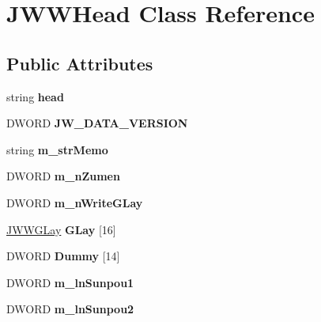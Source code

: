 \hypertarget{classJWWHead}{\section{J\-W\-W\-Head Class Reference}
\label{classJWWHead}
}
\subsection*{Public Attributes}
\begin{DoxyCompactItemize}
\item 
\hypertarget{classJWWHead_a42ddd0bada26e01f5b570d88e48697e4}{string {\bfseries head}}\label{classJWWHead_a42ddd0bada26e01f5b570d88e48697e4}

\item 
\hypertarget{classJWWHead_acd75c404ff5f2b93a2b0828c1072fbe4}{D\-W\-O\-R\-D {\bfseries J\-W\-\_\-\-D\-A\-T\-A\-\_\-\-V\-E\-R\-S\-I\-O\-N}}\label{classJWWHead_acd75c404ff5f2b93a2b0828c1072fbe4}

\item 
\hypertarget{classJWWHead_a12cbcb64e7adb55b2a2ab24281628407}{string {\bfseries m\-\_\-str\-Memo}}\label{classJWWHead_a12cbcb64e7adb55b2a2ab24281628407}

\item 
\hypertarget{classJWWHead_aaa83f7c03f11665304b89afc8acf39bc}{D\-W\-O\-R\-D {\bfseries m\-\_\-n\-Zumen}}\label{classJWWHead_aaa83f7c03f11665304b89afc8acf39bc}

\item 
\hypertarget{classJWWHead_aadb606ef740dc4cafbaa9666deaf0db2}{D\-W\-O\-R\-D {\bfseries m\-\_\-n\-Write\-G\-Lay}}\label{classJWWHead_aadb606ef740dc4cafbaa9666deaf0db2}

\item 
\hypertarget{classJWWHead_a55dbf907305476798249ee6cbbfc95dc}{\hyperlink{struct__JWWGLay}{J\-W\-W\-G\-Lay} {\bfseries G\-Lay} \mbox{[}16\mbox{]}}\label{classJWWHead_a55dbf907305476798249ee6cbbfc95dc}

\item 
\hypertarget{classJWWHead_aeb51216a8750461a1315936b0d30d538}{D\-W\-O\-R\-D {\bfseries Dummy} \mbox{[}14\mbox{]}}\label{classJWWHead_aeb51216a8750461a1315936b0d30d538}

\item 
\hypertarget{classJWWHead_a731b91cd0c055170239b033f7de8ddce}{D\-W\-O\-R\-D {\bfseries m\-\_\-ln\-Sunpou1}}\label{classJWWHead_a731b91cd0c055170239b033f7de8ddce}

\item 
\hypertarget{classJWWHead_a32eeb932775febdc371a01e4bc37ceb1}{D\-W\-O\-R\-D {\bfseries m\-\_\-ln\-Sunpou2}}\label{classJWWHead_a32eeb932775febdc371a01e4bc37ceb1}


\end{DoxyCompactItemize}

